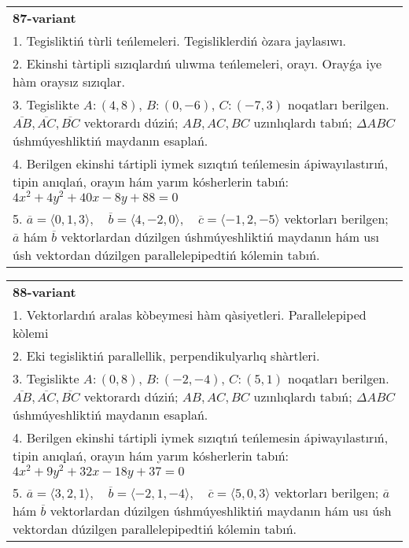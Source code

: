 \documentclass{article}
\begin{document}
\begin{tabular}{m{17cm}}
\textbf{87-variant}\\
1. Tegisliktiń tùrli teńlemeleri. Tegisliklerdiń òzara jaylasıwı.\\

2. Ekinshi tàrtipli sızıqlardıń ulıwma teńlemeleri, orayı. Orayǵa iye hàm oraysız sızıqlar.\\

3. Tegislikte $A: (4, 8)$, $B: (0, -6)$, $C: (-7, 3)$ noqatları berilgen. $\overline{AB}, \overline{AC}, \overline{BC}$ vektorardı dúziń; $AB, AC, BC$ uzınlıqlardı tabıń; $\Delta ABC$ úshmúyeshliktiń maydanın esaplań. \\

4. Berilgen ekinshi tártipli iymek sızıqtıń teńlemesin ápiwayılastırıń, tipin anıqlań, orayın hám yarım kósherlerin tabıń: $4x^2+4y^2+40x-8y+88=0$\\

5. \(\overline{a} = \langle 0, 1, 3 \rangle, \quad \overline{b} = \langle 4, -2, 0 \rangle, \quad \overline{c} = \langle -1, 2, -5 \rangle\) vektorları berilgen; \(\overline{a}\) hám \(\overline{b}\) vektorlardan dúzilgen úshmúyeshliktiń maydanın hám usı úsh vektordan dúzilgen parallelepipedtiń kólemin tabıń.
\end{tabular}
\vspace{1cm}


\begin{tabular}{m{17cm}}
\textbf{88-variant}\\
1. Vektorlardıń aralas kòbeymesi hàm qàsiyetleri. Parallelepiped kòlemi\\

2. Eki tegisliktiń parallellik, perpendikulyarlıq shàrtleri.\\

3. Tegislikte $A: (0, 8)$, $B: (-2, -4)$, $C: (5, 1)$ noqatları berilgen. $\overline{AB}, \overline{AC}, \overline{BC}$ vektorardı dúziń; $AB, AC, BC$ uzınlıqlardı tabıń; $\Delta ABC$ úshmúyeshliktiń maydanın esaplań. \\

4. Berilgen ekinshi tártipli iymek sızıqtıń teńlemesin ápiwayılastırıń, tipin anıqlań, orayın hám yarım kósherlerin tabıń: $4x^2+9y^2+32x-18y+37=0$\\

5. \(\overline{a} = \langle 3, 2, 1 \rangle, \quad \overline{b} = \langle -2, 1, -4 \rangle, \quad \overline{c} = \langle 5, 0, 3 \rangle\) vektorları berilgen; \(\overline{a}\) hám \(\overline{b}\) vektorlardan dúzilgen úshmúyeshliktiń maydanın hám usı úsh vektordan dúzilgen parallelepipedtiń kólemin tabıń.
\end{tabular}
\vspace{1cm}
\end{document}
